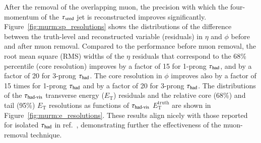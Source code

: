         After the removal of the overlapping muon, the precision with which the four-momentum of the $\tau_\mathrm{seed}$ jet is reconstructed 
        improves significantly. Figure~\ref{fig:murm:sp_resolutions} shows the distributions of 
        the difference between the truth-level and reconstructed variable (residuals) 
        in $\eta$ and $\phi$ before and after muon removal. Compared to the performance before muon removal, the root mean square (RMS)
        widths of the $\eta$ residuals that correspond to the 68\% percentile (core resolution) 
        improves by a factor of 15 for 1-prong $\tau_{\text{had}}$, and by a factor of 20 for 3-prong $\tau_{\text{had}}$. 
        The core resolution in $\phi$ improves also by a factor of 15 times for 1-prong $\tau_{\text{had}}$ and by a factor of 20 for 3-prong $\tau_{\text{had}}$. 
        The distributions of the $\tau_{\text{had-vis}}$ transverse energy ($E_\mathrm{T}$) residuals and the relative core (68\%) and 
        tail (95\%) $E_\mathrm{T}$ resolutions as functions of $\tau_{\text{had-vis}}$ $E_\mathrm{T}^\mathrm{truth}$ are shown in 
        Figure~\ref{fig:murm:e_resolutions}. These results align nicely with those reported for isolated $\tau_{\text{had}}$ in ref.~\cite{PERF-2014-06}, 
        demonstrating further the effectiveness of the muon-removal technique.

